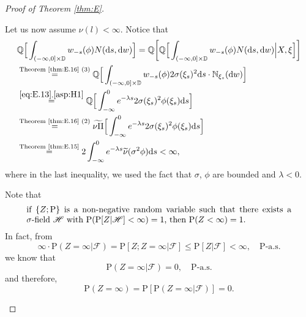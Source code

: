 \documentclass[12pt,a4paper]{amsart}
\numberwithin{equation}{section}
\theoremstyle{plain}
\theoremstyle{definition}
\theoremstyle{remark}
\newenvironment{proof*}[1][\proofname]{
	\renewcommand\qedsymbol{\rule{3mm}{3mm}}
	\begin{proof}[#1]}{\end{proof}}
\begin{document}
\begin{proof}[Proof of Theorem \ref{thm:E}]
\begin{proof*}
	Let us now assume $\nu(l)<\infty$.
	Notice that
	\begin{align}
	&\mathbb Q\Big[\int_{(-\infty,0]\times \mathbb D}w_{-s}(\phi) N({\mathrm d}s, {\mathrm d}w) \Big]
	= \mathbb Q\bigg[\mathbb Q\Big[\int_{(-\infty,0]\times \mathbb D}w_{-s}(\phi) N({\mathrm d}s, {\mathrm d}w) \Big | X, \xi \Big]\bigg]%
	\\& \overset{\text{Theorem \ref{thm:E.16} (3)}}= \mathbb Q\Big[\int_{(-\infty,0]\times \mathbb D}w_{-s}(\phi) 2 \sigma(\xi_s)^2 {\mathrm d}s \cdot \mathbb N_{\xi_s}({\mathrm d}w) \Big]%
	\\& \overset{\eqref{eq:E.13}, \eqref{asp:H1}}=\mathbb Q \Big[\int^0_{-\infty} e^{-\lambda s} 2\sigma(\xi_s)^2 \phi(\xi_s) \mathrm ds\Big]
	\\&\overset{\text{Theorem \ref{thm:E.16} (2)}}=\widetilde{\nu \Pi} \Big[\int^0_{-\infty} e^{-\lambda s} 2\sigma(\xi_s)^2 \phi(\xi_s) \mathrm ds\Big]
	\\&\label{eq:E.64}\overset{\text{Theorem \ref{thm:E.15}}}= 2\int^0_{-\infty} e^{-\lambda s} \widetilde\nu(\sigma^2 \phi) \mathrm ds
	<\infty,
	\end{align}
	where in the last inequality, we used the fact that $\sigma$, $\phi$ are bounded and $\lambda < 0$.

	Note that 
\begin{equation} \label{eq:E.65}
\begin{minipage}{0.9\textwidth}
	if $\{Z; \mathrm P\}$ is a non-negative random variable such that there exists a $\sigma$-field $\mathscr H$ with $\mathrm P(\mathrm P[Z|\mathscr H] < \infty) = 1$, then $\mathrm P(Z < \infty) = 1$.
\end{minipage}
\end{equation}
	In fact, from
\[
	\infty \cdot \mathrm P(Z = \infty | \mathscr F)
	 = \mathrm P[Z ; Z = \infty | \mathscr F] 
	 \leq \mathrm P[Z| \mathscr F] < \infty, \quad \mathrm P\text{-a.s.}
\] 
	we know that 
\[
	\mathrm P(Z = \infty| \mathscr F) = 0, \quad \mathrm P\text{-a.s.}
\]
	and therefore,
\[
	\mathrm P(Z = \infty) = \mathrm P[\mathrm P(Z = \infty| \mathscr F)] = 0.
\]

	

\end{proof*}
\end{proof}
\end{document}
